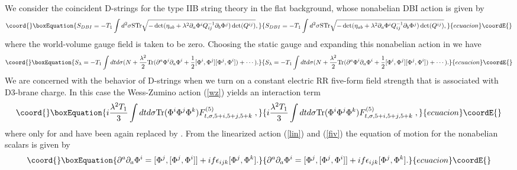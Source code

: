 \documentclass[12pt,a4paper]{article}
\providecommand{\la}{\lambda}
\begin{document}
We consider the \coordHE{} coincident D-strings for the type IIB string theory in
the flat background, whose nonabelian DBI action is given by
\begin{equation}\coord{}\boxEquation{
S_{DBI} = - T_1 \int d^2\sigma \mathrm{STr} \sqrt{-\det (\eta_{ab} + 
\la^2\partial_a\Phi^iQ^{-1}_{ij}\partial_b\Phi^j)\det(Q^{ij})},
\label{dst}}{
S_{DBI} = - T_1 \int d^2\sigma \mathrm{STr} \sqrt{-\det (\eta_{ab} + 
\la^2\partial_a\Phi^iQ^{-1}_{ij}\partial_b\Phi^j)\det(Q^{ij})},
}{ecuacion}\coordE{}\end{equation}
where the world-volume gauge field is taken to be zero. Choosing the 
static gauge \coordHE{} and expanding this nonabelian
action in \myHighlight{$\la$}\coordHE{} we have
\begin{equation}\coord{}\boxEquation{
S_{\la} = -T_1 \int dtd\sigma ( N + \frac{\la^2}{2}\mathrm{Tr}
(\partial^a\Phi^i\partial_a\Phi^i + \frac{1}{2}[\Phi^i,\Phi^j]
[\Phi^j,\Phi^i]) + \cdots ).
\label{lin}}{
S_{\la} = -T_1 \int dtd\sigma ( N + \frac{\la^2}{2}\mathrm{Tr}
(\partial^a\Phi^i\partial_a\Phi^i + \frac{1}{2}[\Phi^i,\Phi^j]
[\Phi^j,\Phi^i]) + \cdots ).
}{ecuacion}\coordE{}\end{equation}
We are concerned with the behavior of \coordHE{} D-strings when we turn on a 
constant electric RR five-form field strength \coordHE{} that is associated
with D3-brane charge. In this case the Wess-Zumino action (\ref{wz}) 
yields an interaction term
\begin{equation}\coord{}\boxEquation{
i\frac{\la^2T_1}{3}\int dtd\sigma \mathrm{Tr}(\Phi^i\Phi^j\Phi^k)
F^{(5)}_{t,\sigma,5+i,5+j,5+k}\; ,
\label{fiv}}{
i\frac{\la^2T_1}{3}\int dtd\sigma \mathrm{Tr}(\Phi^i\Phi^j\Phi^k)
F^{(5)}_{t,\sigma,5+i,5+j,5+k}\; ,
}{ecuacion}\coordE{}\end{equation}
where \coordHE{} only for \coordHE{} and
\coordHE{} have been again replaced by \coordHE{}. From 
the linearized action (\ref{lin}) and 
(\ref{fiv}) the equation of motion for the nonabelian scalars is given by
\begin{equation}\coord{}\boxEquation{
\partial^a\partial_a \Phi^i = [\Phi^j,[\Phi^j,\Phi^i]] + 
if\epsilon_{ijk}[\Phi^j,\Phi^k].
}{
\partial^a\partial_a \Phi^i = [\Phi^j,[\Phi^j,\Phi^i]] + 
if\epsilon_{ijk}[\Phi^j,\Phi^k].
}{ecuacion}\coordE{}\end{equation}
\end{document}

